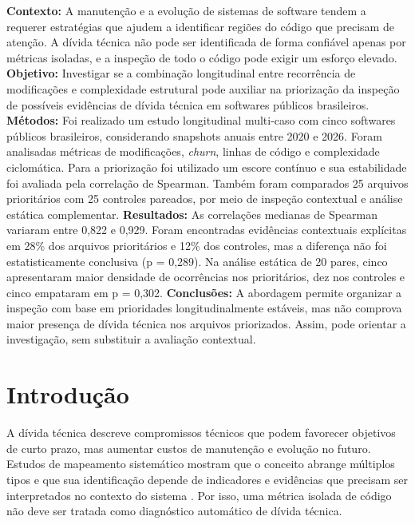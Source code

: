 \documentclass[12pt]{article}
\begin{document}
\begin{resumo}
\textbf{Contexto:} A manutenção e a evolução de sistemas de software tendem a requerer estratégias que ajudem a identificar regiões do código que precisam de atenção. A dívida técnica não pode ser identificada de forma confiável apenas por métricas isoladas, e a inspeção de todo o código pode exigir um esforço elevado.
\textbf{Objetivo:} Investigar se a combinação longitudinal entre recorrência de modificações e complexidade estrutural pode auxiliar na priorização da inspeção de possíveis evidências de dívida técnica em softwares públicos brasileiros.
\textbf{Métodos:} Foi realizado um estudo longitudinal multi-caso com cinco softwares públicos brasileiros, considerando snapshots anuais entre 2020 e 2026. Foram analisadas métricas de modificações, \textit{churn}, linhas de código e complexidade ciclomática. Para a priorização foi utilizado um escore contínuo e sua estabilidade foi avaliada pela correlação de Spearman. Também foram comparados 25 arquivos prioritários com 25 controles pareados, por meio de inspeção contextual e análise estática complementar.
\textbf{Resultados:} As correlações medianas de Spearman variaram entre 0,822 e 0,929. Foram encontradas evidências contextuais explícitas em 28\% dos arquivos prioritários e 12\% dos controles, mas a diferença não foi estatisticamente conclusiva (p = 0,289). Na análise estática de 20 pares, cinco apresentaram maior densidade de ocorrências nos prioritários, dez nos controles e cinco empataram em p = 0,302.
\textbf{Conclusões:} A abordagem permite organizar a inspeção com base em prioridades longitudinalmente estáveis, mas não comprova maior presença de dívida técnica nos arquivos priorizados. Assim, pode orientar a investigação, sem substituir a avaliação contextual.
\end{resumo}

\section{Introdução}

A dívida técnica descreve compromissos técnicos que podem favorecer objetivos de curto prazo, mas aumentar custos de manutenção e evolução no futuro. Estudos de mapeamento sistemático mostram que o conceito abrange múltiplos tipos e que sua identificação depende de indicadores e evidências que precisam ser interpretados no contexto do sistema \cite{li2015mapping,alves2016identification}. Por isso, uma métrica isolada de código não deve ser tratada como diagnóstico automático de dívida técnica.
\end{document}
